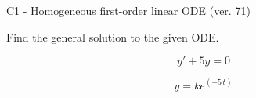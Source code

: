\begin{exercise}
  \begin{exerciseTitle}C1 - Homogeneous first-order linear ODE (ver. 71)\end{exerciseTitle}
  \begin{exerciseStatement}
    
Find the general solution to the given ODE.

    
\[y'+5y=0\]

  \end{exerciseStatement}
  \begin{exerciseAnswer}
    
\[y= k e^{\left(-5 \, t\right)}\]

  \end{exerciseAnswer}
\end{exercise}